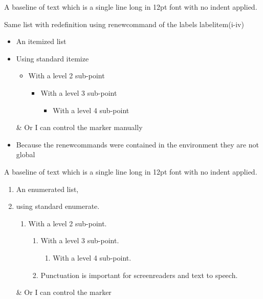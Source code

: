 \documentclass[12pt,a4paper]{article}
\theoremstyle{clearprint}
\begin{document}
\noindent
A baseline of text which is a single line long in 12pt font with no indent applied.

Same list with redefinition using renewcommand of the labels labelitem(i-iv)
\begin{itemize}
\renewcommand{\labelitemi}{*}
\renewcommand{\labelitemii}{**}
\renewcommand{\labelitemiii}{***}
\renewcommand{\labelitemiv}{****}
\item An itemized list
\item Using standard itemize
\begin{itemize}
\item With a level 2 sub-point
\begin{itemize}
\item With a level 3 sub-point
\begin{itemize}
\item With a level 4 sub-point
\end{itemize}
\end{itemize}
\end{itemize}
\item[\&] Or I can control the marker manually
\end{itemize}

\begin{itemize}
\item Because the renewcommands were contained in the environment they are not global
\end{itemize}

\noindent
A baseline of text which is a single line long in 12pt font with no indent applied.

\begin{enumerate}
\item An enumerated list,
\item using standard enumerate.
\begin{enumerate}
\item With a level 2 sub-point.
\begin{enumerate}
\item With a level 3 sub-point.
\begin{enumerate}
\item With a level 4 sub-point.
\end{enumerate}
\item Punctuation is important for screenreaders and text to speech.
\end{enumerate}
\end{enumerate}
\item[\&] Or I can control the marker
\end{enumerate}
\end{document}
